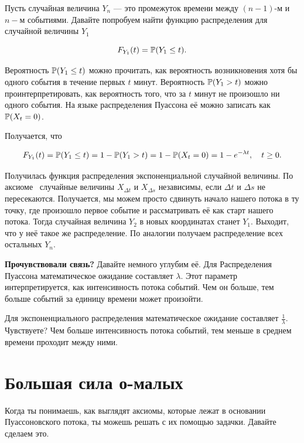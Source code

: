 \documentclass[12pt, a4paper, oneside]{article}
\begin{document}
Пусть случайная величина $Y_n$ --- это промежуток времени между $(n-1)$-м и $n-$м событиями. Давайте попробуем найти функцию распределения для случайной величины $Y_1$

\[ F_{Y_1}(t) = \mathbb{P}(Y_1 \le t).\]

Вероятность $\mathbb{P}(Y_1 \le t)$ можно прочитать, как вероятность возникновения хотя бы одного события в течение первых $t$ минут. Вероятность $\mathbb{P}(Y_1 > t)$ можно проинтерпретировать, как вероятность того, что за $t$ минут не произошло ни одного события. На языке распределения Пуассона её можно записать как $\mathbb{P}(X_t = 0)$.

Получается, что 

\[ F_{Y_1}(t) = \mathbb{P}(Y_1 \le t) = 1 - \mathbb{P}(Y_1 > t) = 1 - \mathbb{P}(X_t = 0) = 1 - e^{-\lambda t}, \quad t \ge 0.\]

Получилась функция распределения экспоненциальной случайной величины. По аксиоме~ случайные величины $X_{\Delta t}$ и $X_{\Delta s}$ независимы, если $\Delta t$ и $\Delta s$ не пересекаются. Получается, мы можем просто сдвинуть начало нашего потока в ту точку, где произошло первое событие и рассматривать её как старт нашего потока. Тогда случайная величина $Y_2$ в новых координатах станет $Y_1$. Выходит, что у  неё такое же распределение. По аналогии получаем распределение всех остальных $Y_n$. 

\textbf{Прочувствовали связь?}  Давайте немного углубим её. Для Распределения Пуассона математическое ожидание составляет $\lambda$. Этот параметр интерпретируется, как интенсивность потока событий. Чем он больше, тем больше событий за единицу времени может произойти. 

Для экспоненциального распределения математическое ожидание составляет $\frac{1}{\lambda}$. Чувствуете? Чем больше интенсивность потока событий, тем меньше в среднем времени проходит между ними.  

\section{Большая сила о-малых}

Когда ты понимаешь, как выглядят аксиомы, которые лежат в основании Пуассоновского потока, ты можешь решать с их помощью задачки. Давайте сделаем это. 
\end{document}
